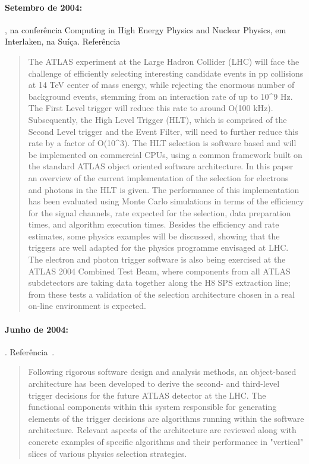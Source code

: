 \paragraph{Setembro de 2004: }, na conferência Computing in High Energy Physics and Nuclear
Physics, em Interlaken, na Suíça. Referência~\cite{aa:chep-04-01}

\begin{quotation}
The ATLAS experiment at the Large Hadron Collider (LHC) will face the
challenge of efficiently selecting interesting candidate events in pp
collisions at 14 TeV center of mass energy, while rejecting the enormous
number of background events, stemming from an interaction rate of up to 10^9
Hz. The First Level trigger will reduce this rate to around O(100
kHz). Subsequently, the High Level Trigger (HLT), which is comprised of the
Second Level trigger and the Event Filter, will need to further reduce this
rate by a factor of O(10^3). The HLT selection is software based and will be
implemented on commercial CPUs, using a common framework built on the standard
ATLAS object oriented software architecture. In this paper an overview of the
current implementation of the selection for electrons and photons in the HLT
is given. The performance of this implementation has been evaluated using
Monte Carlo simulations in terms of the efficiency for the signal channels,
rate expected for the selection, data preparation times, and algorithm
execution times. Besides the efficiency and rate estimates, some physics
examples will be discussed, showing that the triggers are well adapted for the
physics programme envisaged at LHC. The electron and photon trigger software
is also being exercised at the ATLAS 2004 Combined Test Beam, where components
from all ATLAS subdetectors are taking data together along the H8 SPS
extraction line; from these tests a validation of the selection architecture
chosen in a real on-line environment is expected.
\end{quotation}

\paragraph{Junho de 2004: }. Referência~\cite{aa:tns-04-05}. 

\begin{quotation}
Following rigorous software design and analysis methods, an object-based
architecture has been developed to derive the second- and third-level trigger
decisions for the future ATLAS detector at the LHC. The functional components
within this system responsible for generating elements of the trigger
decisions are algorithms running within the software architecture. Relevant
aspects of the architecture are reviewed along with concrete examples of
specific algorithms and their performance in "vertical" slices of various
physics selection strategies.
\end{quotation}

